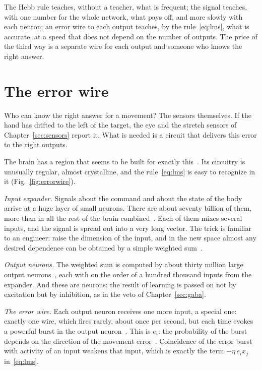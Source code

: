 \begin{keyblock}
\begin{proposition}
\label{prop:teachers}
The Hebb rule teaches, without a teacher, what is frequent; the  signal teaches, with one number for the whole network, what pays off, and more slowly with each neuron; an error wire to each output teaches, by the rule~\eqref{eq:lms}, what is accurate, at a speed that does not depend on the number of outputs. The price of the third way is a separate wire for each output and someone who knows the right answer.
\end{proposition}
\end{keyblock}

\section{The error wire}

Who can know the right answer for a movement? The sensors themselves. If the hand has drifted to the left of the target, the eye and the stretch sensors of Chapter~\ref{sec:sensors} report it. What is needed is a circuit that delivers this error to the right outputs.

The brain has a region that seems to be built for exactly this~\cite{Marr1969,Albus1971}. Its circuitry is unusually regular, almost crystalline, and the rule~\eqref{eq:lms} is easy to recognize in it (Fig.~\ref{fig:errorwire}).

\emph{Input expander.} Signals about the command and about the state of the body arrive at a huge layer of small  neurons. There are about seventy billion of them, more than in all the rest of the brain combined~\cite{Azevedo2009}. Each of them mixes several inputs, and the signal is spread out into a very long vector. The trick is familiar to an engineer: raise the dimension of the input, and in the new space almost any desired dependence can be obtained by a simple weighted sum~\cite{Cover1965}.

\emph{Output neurons.} The weighted sum is computed by about thirty million large output neurons~\cite{Andersen1992cereb}, each with on the order of a hundred thousand inputs from the expander. And these are  neurons: the result of learning is passed on not by excitation but by inhibition, as in the veto of Chapter~\ref{sec:gaba}.

\emph{The error wire.} Each output neuron receives one more input, a special one: exactly one  wire, which fires rarely, about once per second, but each time evokes a powerful burst in the output neuron~\cite{Ito2001}. This is $e_i$: the probability of the burst depends on the direction of the movement error~\cite{Herzfeld2018}. Coincidence of the error burst with activity of an input weakens that input, which is exactly the term $-\eta\,e_i x_j$ in~\eqref{eq:lms}.


